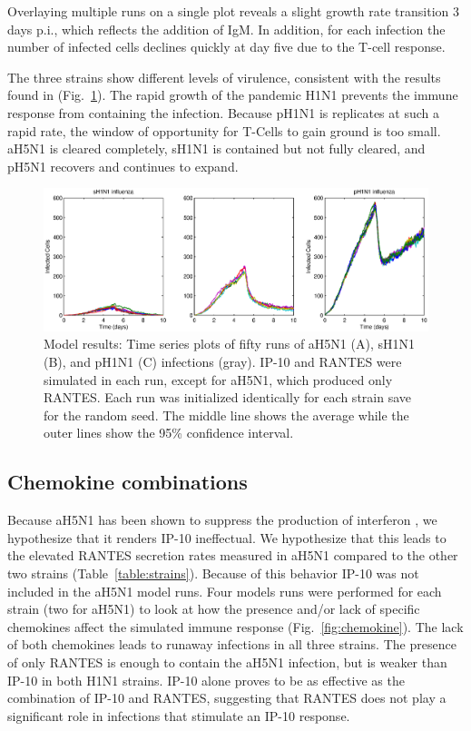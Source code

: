 \documentclass[10pt]{article}
\begin{document}
Overlaying multiple runs on a single plot reveals a slight growth rate transition 3 days p.i., which reflects the addition of IgM.  In addition, for each infection the number of infected cells declines quickly at day five due to the T-cell response. 

The three strains show different levels of virulence, consistent with the results found in \cite{Mitchell2011} (Fig.~\ref{fig:variance}).  The rapid growth of the pandemic H1N1 prevents the immune response from containing the infection.  Because pH1N1 is replicates at such a rapid rate, the window of opportunity for T-Cells to gain ground is too small.  aH5N1 is cleared completely, sH1N1 is contained but not fully cleared, and pH5N1 recovers and continues to expand.

\begin{figure}[ht!]
\begin{center}
 \includegraphics[width=\textwidth]{variance}
 \end{center}
\caption{Model results: Time series plots of fifty runs of aH5N1 (A), sH1N1 (B), and pH1N1 (C) infections (gray). IP-10 and RANTES were simulated in each run, except for aH5N1, which  produced only RANTES.  Each run was initialized identically for each strain save for the random seed.  The middle line shows the average while the outer lines show the 95\% confidence interval.} 
 \label{fig:variance}
\end{figure}


\subsection{Chemokine combinations}

Because aH5N1 has been shown to suppress the production of interferon \cite{Mitchell2011}, we hypothesize that it renders IP-10 ineffectual.  We hypothesize that this leads to the elevated RANTES secretion rates measured in aH5N1 compared to the other two strains (Table~\ref{table:strains}).  Because of this behavior IP-10 was not included in the aH5N1 model runs.  Four models runs were performed for each strain (two for aH5N1) to look at how the presence and/or lack of specific chemokines affect the simulated immune response (Fig.~\ref{fig:chemokine}).  The lack of both chemokines leads to runaway infections in all three strains.  The presence of only RANTES is enough to contain the aH5N1 infection, but is weaker than IP-10 in both H1N1 strains.  IP-10 alone proves to be as effective as the combination of IP-10 and RANTES, suggesting that RANTES does not play a significant role in infections that stimulate an IP-10 response.
\end{document}
